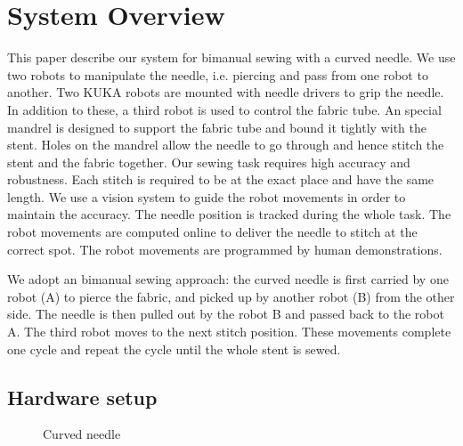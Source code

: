 \section{System Overview}


This paper describe our system for bimanual sewing with a curved needle. We use two robots to manipulate the needle, i.e. piercing and pass from one robot to another. Two KUKA robots are mounted with needle drivers to grip the needle. In addition to these, a third robot is used to control the fabric tube. An special mandrel is designed to support the fabric tube and bound it tightly with the stent. Holes on the mandrel allow the needle to go through and hence stitch the stent and the fabric together. Our sewing task requires high accuracy and robustness. Each stitch is required to be at the exact place and have the same length. We use a vision system to guide the robot movements in order to maintain the accuracy. The needle position is tracked during the whole task. The robot movements are computed online to deliver the needle to stitch at the correct spot. The robot movements are programmed by human demonstrations.

We adopt an bimanual sewing approach: the curved needle is first carried by one robot (A) to pierce the fabric, and picked up by another robot (B) from the other side. The needle is then pulled out by the robot B and passed back to the robot A. The third robot moves to the next stitch position. These movements complete one cycle and repeat the cycle until the whole stent is sewed.



\subsection{Hardware setup}

\begin{figure}
\centering
{
\caption{\scriptsize{Curved needle}}
\label{fig:curvedneedle}
}
\end{figure}

